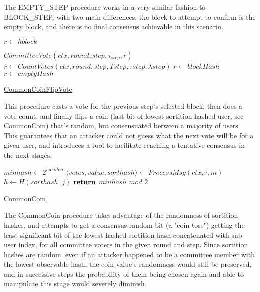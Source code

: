 \documentclass[10pt,a4paper]{article}
\begin{document}
The EMPTY\_STEP procedure works in a very similar fashion to BLOCK\_STEP, with two main differences: 
the block to attempt to confirm is the empty block, and there is no final consensus achievable in this scenario.


\begin{algorithm}
    \begin{algorithmic}[H]
        \State $r \gets hblock$
    
        \State $CommitteeVote(ctx, round, step, \tau_{step}, r)$
        \State $r \gets CountVotes(ctx,round,step,Tstep,τstep,λstep)$
                \State $r \gets blockHash$
            \Else
                \State $r \gets emptyHash$
            \EndIf
        \EndIf

    \end{algorithmic}
    \caption{\underline{CommonCoinFlipVote}}
\end{algorithm}

This procedure casts a vote for the previous step's selected block, then does a vote count,
and finally flips a coin (last bit of lowest sortition hashed user, see CommonCoin) that's random,
but consensuated between a majority of users. This guarantees that an attacker could not guess what the
next vote will be for a given user, and introduces a tool to facilitate reaching a tentative consensus in the next stages.

\begin{algorithm}
    \begin{algorithmic}[H]

    \State $minhash \gets 2^{hashlen}$
        \State $⟨votes,value,sorthash⟩ \gets ProcessMsg(ctx,\tau,m)$
                \State $h \gets H(sorthash||j)$
        \EndFor
    \EndFor
    $\Return$ $minhash$ $mod$ $2$

    \end{algorithmic}
    \caption{\underline{CommonCoin}}
\end{algorithm}

The CommonCoin procedure takes advantage of the randomness of sortition hashes, and attempts to
get a consensus random bit (a "coin toss") getting the least significant bit of the lowest hashed
sortition hash concatenated with sub-user index, for all committee voters in the given round and step.
Since sortition hashes are random, even if an attacker happened to be a committee member with the lowest observable hash,
the coin value's randomness would still be preserved, and in successive steps the probability of them being chosen again and
able to manipulate this stage would severely diminish.
\end{document}
